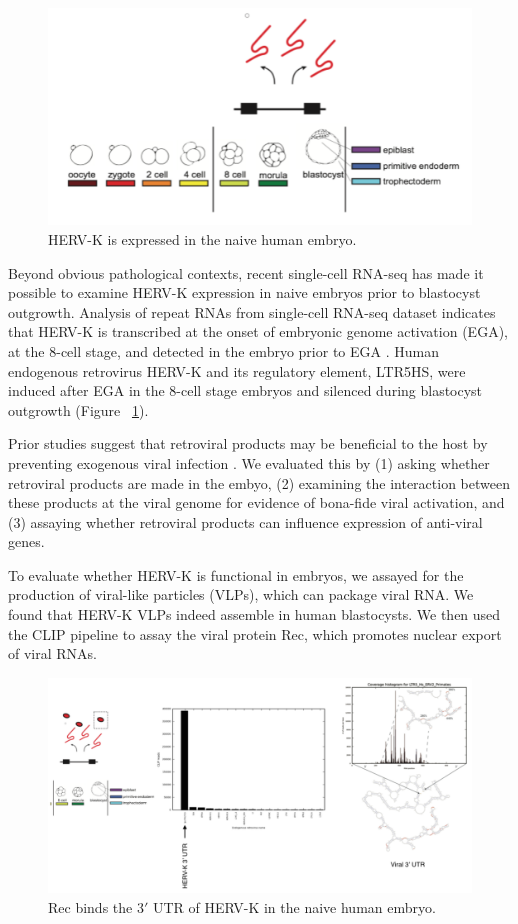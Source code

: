 \begin{figure}
\center\includegraphics[width=130mm,scale=0.5]{Figures/Fig25}
\caption{HERV-K is expressed in the naive human embryo.}
\label{fig:Fig25}
\end{figure}

Beyond obvious pathological contexts, recent single-cell RNA-seq has made it possible to examine HERV-K expression in naive embryos prior to blastocyst outgrowth. Analysis of repeat RNAs from single-cell RNA-seq dataset indicates that HERV-K is transcribed at the onset of embryonic genome activation (EGA), at the 8-cell stage, and detected in the embryo prior to EGA \cite{Yan:2013dv}. Human endogenous retrovirus HERV-K and its regulatory element, LTR5HS, were induced after EGA in the 8-cell stage embryos and silenced during blastocyst outgrowth (Figure ~\ref{fig:Fig25}).

Prior studies suggest that retroviral products may be beneficial to the host by preventing exogenous viral infection \cite{WangJohanning:2003es}. We evaluated this by (1) asking whether retroviral products are made in the embyo, (2) examining the interaction between these products at the viral genome for evidence of bona-fide viral activation, and (3) assaying whether retroviral products can influence expression of anti-viral genes.

To evaluate whether HERV-K is functional in embryos, we assayed for the production of viral-like particles (VLPs), which can package viral RNA. We found that HERV-K VLPs indeed assemble in human blastocysts. We then used the CLIP pipeline to assay the viral protein Rec, which promotes nuclear export of viral RNAs. 

\begin{figure}
\center\includegraphics[width=130mm,scale=0.5]{Figures/Fig26}
\caption{Rec binds the 3$'$ UTR of HERV-K in the naive human embryo.}
\label{fig:Fig26}
\end{figure}

